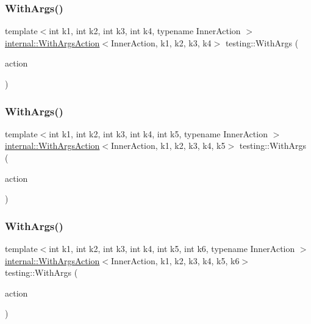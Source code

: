 \subsubsection{\texorpdfstring{With\+Args()}{WithArgs()}\hspace{0.1cm}{\footnotesize\ttfamily [4/10]}}
{\footnotesize\ttfamily template$<$int k1, int k2, int k3, int k4, typename Inner\+Action $>$ \\
\hyperlink{classtesting_1_1internal_1_1_with_args_action}{internal\+::\+With\+Args\+Action}$<$Inner\+Action, k1, k2, k3, k4$>$ testing\+::\+With\+Args (\begin{DoxyParamCaption}\item[{const Inner\+Action \&}]{action }\end{DoxyParamCaption})\hspace{0.3cm}{\ttfamily [inline]}}

\mbox{\label{namespacetesting_aa36b0c7216df96bdacf9fe491afd40bd}} 
\subsubsection{\texorpdfstring{With\+Args()}{WithArgs()}\hspace{0.1cm}{\footnotesize\ttfamily [5/10]}}
{\footnotesize\ttfamily template$<$int k1, int k2, int k3, int k4, int k5, typename Inner\+Action $>$ \\
\hyperlink{classtesting_1_1internal_1_1_with_args_action}{internal\+::\+With\+Args\+Action}$<$Inner\+Action, k1, k2, k3, k4, k5$>$ testing\+::\+With\+Args (\begin{DoxyParamCaption}\item[{const Inner\+Action \&}]{action }\end{DoxyParamCaption})\hspace{0.3cm}{\ttfamily [inline]}}

\mbox{\label{namespacetesting_a6df9cd27659e5943b5d3d77fc4f102e3}} 
\subsubsection{\texorpdfstring{With\+Args()}{WithArgs()}\hspace{0.1cm}{\footnotesize\ttfamily [6/10]}}
{\footnotesize\ttfamily template$<$int k1, int k2, int k3, int k4, int k5, int k6, typename Inner\+Action $>$ \\
\hyperlink{classtesting_1_1internal_1_1_with_args_action}{internal\+::\+With\+Args\+Action}$<$Inner\+Action, k1, k2, k3, k4, k5, k6$>$ testing\+::\+With\+Args (\begin{DoxyParamCaption}\item[{const Inner\+Action \&}]{action }\end{DoxyParamCaption})\hspace{0.3cm}{\ttfamily [inline]}}

